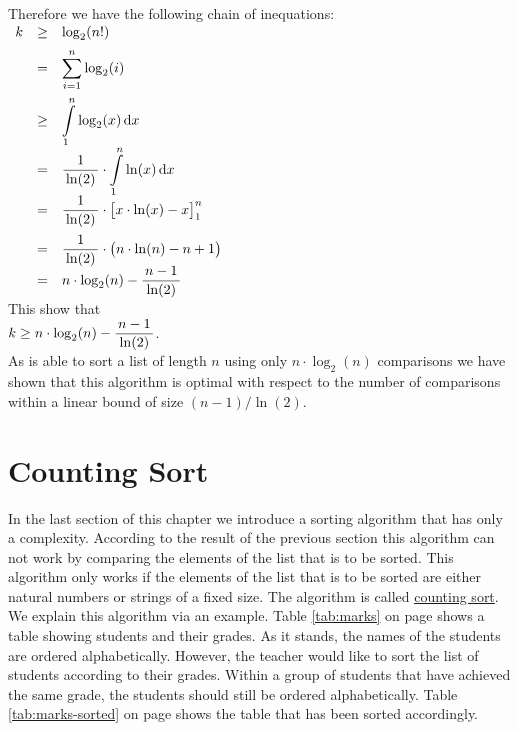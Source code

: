 Therefore we have the following chain of inequations:
\\[0.2cm]
\hspace*{1.3cm}
$
\begin{array}[t]{lcl}
  k & \geq & \displaystyle\log_2(n!) \\[0.2cm]
    & =    & \displaystyle\sum\limits_{i=1}^n \log_2(i) \\[0.5cm]
    & \geq & \displaystyle\int\limits_{1}^n \log_2(x)\, \mathrm{d}x \\[0.2cm]
    & =    & \displaystyle\frac{1}{\,\ln(2)\,} \cdot \int\limits_{1}^n \ln(x)\, \mathrm{d}x  \\[0.2cm]
    & =    & \displaystyle\frac{1}{\,\ln(2)\,} \cdot \bigl[x \cdot \ln(x) - x \bigr]_{1}^n   \\[0.4cm]
    & =    & \displaystyle\frac{1}{\,\ln(2)\,} \cdot \bigl(n \cdot \ln(n) - n + 1\bigr)     \\[0.2cm]
    & =    & \displaystyle n \cdot \log_2(n) - \frac{\,n-1\,}{\,\ln(2)\,}                       
\end{array}
$ 
\\[0.2cm]
This show that
\\[0.2cm]
\hspace*{1.3cm}
$k \geq n \cdot \displaystyle\log_2(n) - \frac{\,n-1\,}{\,\ln(2)\,}$.
\\[0.2cm]
As  is able to sort a list of length $n$ using only $n \cdot \log_2(n)$ comparisons
we have shown that this algorithm is optimal with respect to the number of comparisons within a linear bound of
size $(n-1)/\ln(2)$.




\section{Counting Sort}
In the last section of this chapter we introduce a sorting algorithm that has only a  complexity.
According to the result of the previous section this algorithm can not work by comparing the elements of the
list that is to be sorted.  This algorithm only works if the elements of the list that is to be sorted are
either natural numbers or strings of a fixed size.  The algorithm is called
\href{https://en.wikipedia.org/wiki/Counting_sort}{counting sort}. We 
explain this algorithm via an example.  Table \ref{tab:marks} on page \pageref{tab:marks} shows a table showing
students and their grades.  As it stands, the names of the students are ordered alphabetically.  However, the
teacher would like to sort the list of students according to their grades.  Within a group of students that
have achieved the same grade, the students should still be ordered alphabetically.  Table
\ref{tab:marks-sorted} on page \pageref{tab:marks-sorted} shows the table that has been sorted accordingly.

